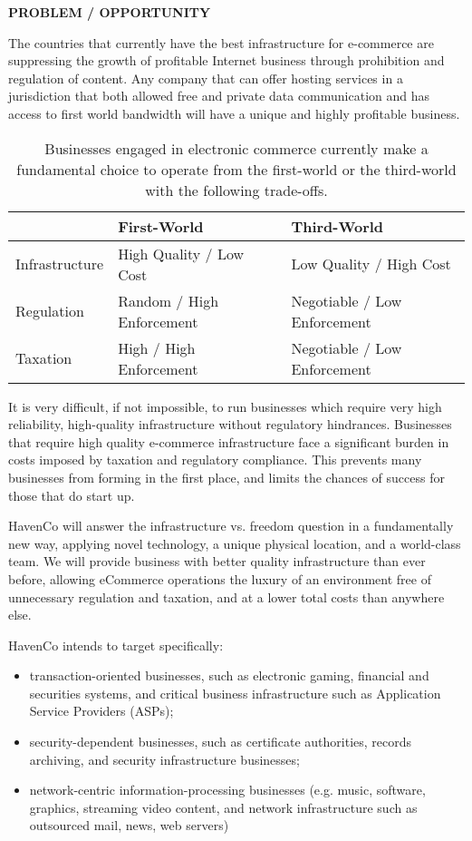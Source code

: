 \textbf{PROBLEM / OPPORTUNITY}

The countries that currently have the best infrastructure for e-commerce are suppressing the growth of profitable Internet business through prohibition and regulation of content. Any company that can offer hosting services in a jurisdiction that both allowed free and private data communication and has access to first world bandwidth will have a unique and highly profitable business.


\begin{table}[h]
\centering
\caption[Havenco business plan chart of quality and law-enforcement trade-offs]{Businesses engaged in electronic commerce currently make a fundamental choice to operate from the first-world or the third-world with the following trade-offs.}
\label{havencotable}
\begin{tabular}{lll}
\hline
               & \textbf{First-World}      & \textbf{Third-World}         \\ \hline
Infrastructure & High Quality / Low Cost   & Low Quality / High Cost      \\ \hline
Regulation     & Random / High Enforcement & Negotiable / Low Enforcement \\ \hline
Taxation       & High / High Enforcement   & Negotiable / Low Enforcement \\ \hline
\end{tabular}
\end{table}

It is very difficult, if not impossible, to run businesses which require very high reliability, high-quality infrastructure without regulatory hindrances. Businesses that require high quality e-commerce infrastructure face a significant burden in costs imposed by taxation and regulatory compliance. This prevents many businesses from forming in the first place, and limits the chances of success for those that do start up.

HavenCo will answer the infrastructure vs. freedom question in a fundamentally new way, applying novel technology, a unique physical location, and a world-class team.  We will provide business with better quality infrastructure than ever before, allowing eCommerce operations the luxury of an environment free of unnecessary regulation and taxation, and at a lower total costs than anywhere else.

HavenCo intends to target specifically:

 
\begin{itemize}
\item transaction-oriented businesses, such as electronic gaming, financial and securities systems, and critical business infrastructure such as Application Service Providers (ASPs);
\item security-dependent businesses, such as certificate authorities, records archiving, and security infrastructure businesses;
\item network-centric information-processing businesses (e.g. music, software, graphics, streaming video content, and network infrastructure such as outsourced mail, news, web servers)
\end{itemize}

